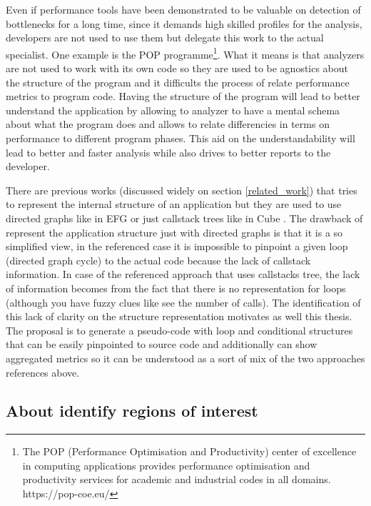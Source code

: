 Even if performance tools have been demonstrated to be valuable on detection of
bottlenecks for a long time, since it demands high skilled profiles for the
analysis, developers are not used to use them but delegate this work to the
actual specialist. One example is the POP programme\footnote{The POP
  (Performance Optimisation and Productivity) center of excellence in computing
  applications provides performance optimisation and productivity services for
academic and industrial codes in all domains. https://pop-coe.eu/}. What it
means is that analyzers are not used to work with its own code so they are used
to be agnostics about the structure of the program and it difficults the process
of relate performance metrics to program code. Having the structure of the
program will lead to better understand the application by allowing to analyzer
to have a mental schema about what the program does and allows to relate
differencies in terms on performance to different program phases. This aid on
the understandability will lead to better and faster analysis while also drives
to better reports to the developer.

There are previous works (discussed widely on section \ref{related_work})  that 
tries to represent the internal structure of an application but they are used to
use directed graphs like in EFG \cite{aguilar2016event} or just callstack trees like
in Cube \cite{saviankou2015cube}. The drawback of represent the application structure
just with directed graphs is that it is a so simplified view, in the referenced
case it is impossible to pinpoint a given loop (directed graph cycle) to the
actual code because the lack of callstack information. In case of the
referenced approach that uses callstacks tree, the lack of information becomes
from the fact that there is no representation for loops (although you have fuzzy
clues like see the number of calls). The identification of this lack of clarity
on the structure representation motivates as well this thesis. The proposal is to 
generate a pseudo-code with loop and conditional structures that can be easily 
pinpointed to source code and additionally can show aggregated metrics so it can 
be understood as a sort of mix of the two approaches references above.

\subsection{About identify regions of
interest}\label{ss:mot_regions_of_interest}

